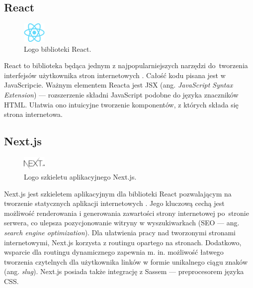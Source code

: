 \documentclass[12pt]{article}
\numberwithin{figure}{section}
\begin{document}
\begin{sloppypar}

\subsection*{React}

\begin{figure}[H] 
    \centering
        \includegraphics[width=0.1\textwidth]{images/react-logo.png}
   \caption{Logo biblioteki React.}
\end{figure}

React to biblioteka będąca jednym z najpopularniejszych narzędzi do~tworzenia interfejsów użytkownika stron internetowych \cite{react}. Całość kodu pisana jest w JavaScripcie. Ważnym elementem Reacta jest JSX (ang. \textit{JavaScript Syntax Extension}) --- rozszerzenie składni JavaScript podobne do języka znaczników HTML. Ułatwia ono intuicyjne tworzenie komponentów, z których składa się strona internetowa.


\subsection*{Next.js}

\begin{figure}[H] 
    \centering
        \includegraphics[width=0.1\textwidth]{images/next-logo.png}
   \caption{Logo szkieletu aplikacyjnego Next.js.}
\end{figure}

Next.js jest szkieletem aplikacyjnym dla biblioteki React pozwalającym na tworzenie statycznych aplikacji internetowych \cite{next}. Jego kluczową cechą jest możliwość renderowania i generowania zawartości strony internetowej po~stronie serwera, co ulepsza pozycjonowanie witryny w wyszukiwarkach (SEO --- ang. \textit{search engine optimization}). Dla ułatwienia pracy nad tworzonymi stronami internetowymi, Next.js korzysta z routingu opartego na stronach. Dodatkowo, wsparcie dla routingu dynamicznego zapewnia m. in. możliwość łatwego tworzenia czytelnych dla użytkownika linków w formie unikalnego ciągu znaków (ang. \textit{slug}). Next.js posiada także integrację z Sassem --- preprocesorem języka CSS.


\end{sloppypar}
\end{document}
